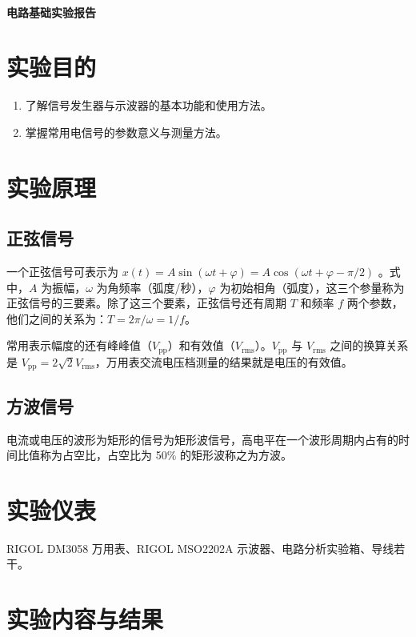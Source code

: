 \documentclass[a4paper,utf8]{article}
\begin{document}
\begin{center}
    {\mbox{}\\[7em]\bfseries\songti%
    电路基础实验报告}\\[34mm]
\end{center}
\newpage
\section{实验目的}
\begin{enumerate}
    \item 了解信号发生器与示波器的基本功能和使用方法。
    \item 掌握常用电信号的参数意义与测量方法。
\end{enumerate}

\section{实验原理}%
\subsection{正弦信号}
一个正弦信号可表示为 $x(t) = A\sin(\omega t+\varphi)=A\cos(\omega t+\varphi-\pi/2)$ 。式中，$A$ 为振幅，$\omega$ 为角频率（弧度/秒），$\varphi$ 为初始相角（弧度），这三个参量称为正弦信号的三要素。除了这三个要素，正弦信号还有周期 $T$ 和频率 $f$ 两个参数，他们之间的关系为：$T=2\pi/\omega=1/f$。\par
常用表示幅度的还有峰峰值（$V_\text{pp}$）和有效值（$V_\text{rms}$）。$V_\text{pp}$ 与 $V_\text{rms}$ 之间的换算关系是 $V_\text{pp}=2\sqrt{2} V_\text{rms}$，万用表交流电压档测量的结果就是电压的有效值。
\subsection{方波信号}
电流或电压的波形为矩形的信号为矩形波信号，高电平在一个波形周期内占有的时间比值称为占空比，占空比为 50\% 的矩形波称之为方波。

\section{实验仪表}
    RIGOL DM3058 万用表、RIGOL MSO2202A 示波器、电路分析实验箱、导线若干。
\section{实验内容与结果}
\end{document}
